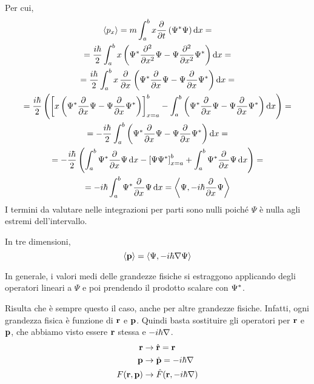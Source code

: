 Per cui,
\begin{gather}
    \avg{p_x}
    = m \int_a^b x \parder{t}\pts{\conj{\Psi} \Psi} \de x = \\
    = \frac{\im \hbar}{2} \int_a^b x \pts{\conj{\Psi} \parder[][2]{x} \Psi - \Psi \parder[][2]{x} \conj{\Psi}} \de x = \\
    = \frac{\im \hbar}{2} \int_a^b x \, \parder{x} \pts{\conj{\Psi} \parder{x} \Psi - \Psi \parder{x} \conj{\Psi}} \de x = \\
    = \frac{\im \hbar}{2} \pts{
        \left[
            x \pts{
                \conj{\Psi} \parder{x} \Psi
                - \Psi \parder{x} \conj{\Psi}
            }
        \right]_{x = a}^b
        - \int_a^b \pts{
            \conj{\Psi} \parder{x} \Psi
            - \Psi \parder{x} \conj{\Psi}
        } \de x
    } = \\
    = -\frac{\im \hbar}{2} \int_a^b \pts{
        \conj{\Psi} \parder{x} \Psi
        - \Psi \parder{x} \conj{\Psi}
    } \de x = \\
    = -\frac{\im \hbar}{2} \pts{
        \int_a^b \conj{\Psi} \parder{x} \Psi \,\de x
        - \left[\Psi \conj{\Psi}\right]_{x = a}^b
        + \int_a^b \conj{\Psi} \parder{x} \Psi \,\de x
    } = \\
    = - \im \hbar \int_a^b \conj{\Psi} \parder{x} \Psi \,\de x
    = \inner{\Psi}{-\im \hbar \parder{x} \Psi}
\end{gather}
I termini da valutare nelle integrazioni per parti sono nulli poiché $\Psi$ è nulla agli estremi dell'intervallo.

In tre dimensioni,
\begin{equation}
    \left\langle \mathbf{p} \right\rangle = \left\langle \Psi, -i \hbar \nabla \Psi \right\rangle
\end{equation}

In generale, i valori medi delle grandezze fisiche si estraggono applicando degli operatori lineari a $\Psi$ e poi prendendo il prodotto scalare con $\Psi^*$.

Risulta che è sempre questo il caso, anche per altre grandezze fisiche.
Infatti, ogni grandezza fisica è funzione di $\mathbf{r}$ e $\mathbf{p}$.
Quindi basta sostituire gli operatori per $\mathbf{r}$ e $\mathbf{p}$, che abbiamo visto essere $\mathbf{r}$ stessa e $-i \hbar \nabla$.
\begin{align}
    \mathbf{r} & \to \hat{\mathbf{r}} = \mathbf{r} \\
    \mathbf{p} & \to \hat{\mathbf{p}} = -i \hbar \nabla \\
    F(\mathbf{r}, \mathbf{p}) & \to \hat{F}(\mathbf{r}, -i \hbar \nabla)
\end{align}

